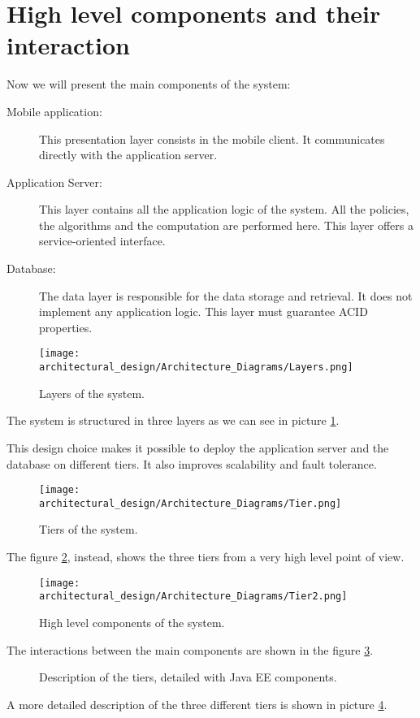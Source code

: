 \section{High level components and their interaction}
Now we will present the main components of the system:
\begin{description}

\item[Mobile application:] This presentation layer consists in the mobile client. It communicates directly with the application server.
\item[Application Server:] This layer contains all the application logic of the system. All the policies, the algorithms and the computation are performed here. This layer offers a service-oriented interface.
\item[Database:] The data layer is responsible for the data storage and retrieval. It does not implement any application logic. This layer must guarantee ACID properties. 
\end{description}

\begin{figure}
\centering
\texttt{[image: architectural\_design/Architecture\_Diagrams/Layers.png]}
\caption{Layers of the system.}
\label{fig:layers}
\end{figure}

The system is structured in three layers as we can see in picture \ref{fig:layers}.

This design choice makes it possible to deploy the application server and the database on different tiers. It also improves scalability and fault tolerance.
\\

\begin{figure}
\centering
\texttt{[image: architectural\_design/Architecture\_Diagrams/Tier.png]}
\caption{Tiers of the system.}
\label{fig:tiers}
\end{figure}

The figure \ref{fig:tiers}, instead, shows the three tiers from a very high level point of view.

\begin{figure}
	\centering
	\texttt{[image: architectural\_design/Architecture\_Diagrams/Tier2.png]}
	\caption{High level components of the system.}
	\label{fig:high_components}
\end{figure}

The interactions between the main components are shown in the figure \ref{fig:high_components}.

\begin{figure}
    \vspace*{-2cm}
    \caption{Description of the tiers, detailed with Java EE components.}
	\label{fig:tiers_description}
\end{figure}

A more detailed description of the three different tiers is shown in picture \ref{fig:tiers_description}.


